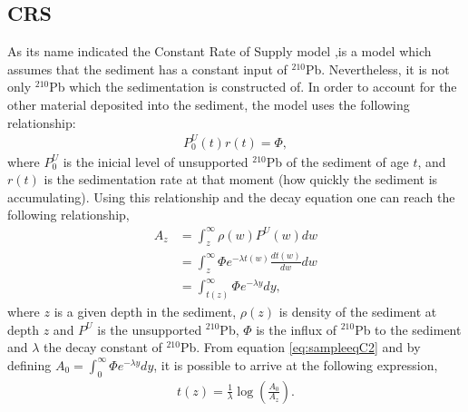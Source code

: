 \documentclass [10pt] {article}
\begin{document}



\subsection{CRS}


As its name indicated the Constant Rate of Supply model \citep{Appleby1978,Appleby1998,Appleby2001,Appleby2008},is a model which assumes that the sediment has a constant input of $^{210}$Pb. Nevertheless, it is not only $^{210}$Pb which the sedimentation is constructed of. In order to account for the other material deposited into the sediment, the model uses the following relationship:
\begin{eqnarray}
	P_0^U(t)r(t) = \Phi,
\end{eqnarray}
where $P_0^U$ is the inicial level of unsupported $^{210}$Pb of the sediment of age $t$, and $r(t)$ is the sedimentation rate at that moment (how quickly the sediment is accumulating). Using this relationship and the decay equation one can reach the following relationship, 
\begin{eqnarray}
	A_{z}&=\int_{z}^{\infty}\rho(w)P^U(w)dw  \nonumber \label{eq:sampleeqC2} \\
	&=\int_{z}^{\infty} \Phi e^{- \lambda t(w) }\frac{dt(w)}{dw} dw \nonumber \\ 
	&=\int_{t(z)}^{\infty} \Phi e^{- \lambda y } dy,  
\end{eqnarray}
where $z$ is a given depth in the sediment, $\rho(z)$ is density of the sediment at depth $z$ and $P^U$ is the unsupported $^{210}$Pb, $\Phi$ is the influx of $^{210}$Pb to the sediment and $\lambda$ the decay constant of $^{210}$Pb. From equation \ref{eq:sampleeqC2} and by defining $A_0=\int_{0}^{\infty} \Phi e^{- \lambda y } dy$, it is possible to arrive at the following expression,
\begin{eqnarray}
t(z)= \frac{1}{\lambda}\log\left(\frac{A_0}{A_{z}}\right).
\end{eqnarray}
\end{document}

